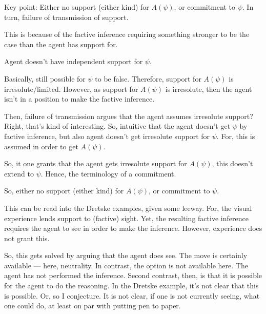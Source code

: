 \documentclass[10pt]{article}
\begin{document}
\begin{note}
  {
    \color{red}
    Key point: Either no support (either kind) for \(A(\psi)\), or commitment to \(\psi\).
  }
  In turn, failure of transmission of support.

  This is because of the factive inference requiring something stronger to be the case than the agent has support for.

  Agent doesn't have independent support for \(\psi\).

  Basically, still possible for \(\psi\) to be false.
  Therefore, support for \(A(\psi)\) is irresolute/limited.
  However, as support for \(A(\psi)\) is irresolute, then the agent isn't in a position to make the factive inference.

  Then, failure of transmission argues that the agent assumes irresolute support?
  Right, that's kind of interesting.
  So, intuitive that the agent doesn't get \(\psi\) by factive inference, but also agent doesn't get irresolute support for \(\psi\).
  For, this is assumed in order to get \(A(\psi)\).

  So, it one grants that the agent gets irresolute support for \(A(\psi)\), this doesn't extend to \(\psi\).
  Hence, the terminology of a commitment.

  So, either no support (either kind) for \(A(\psi)\), or commitment to \(\psi\).
\end{note}

\begin{note}
  This can be read into the Dretske examples, given some leeway.
  For, the visual experience lends support to (factive) sight.
  Yet, the resulting factive inference requires the agent to see in order to make the inference.
  However, experience does not grant this.

  So, this gets solved by arguing that the agent does see.
  The move is certainly available --- here, neutrality.
  In contrast, the option is not available here.
  The agent has not performed the inference.
  Second contrast, then, is that it is possible for the agent to do the reasoning.
  In the Dretske example, it's not clear that this is possible.
  Or, so I conjecture.
  It is not clear, if one is not currently seeing, what one could do, at least on par with putting pen to paper.
\end{note}
\end{document}
